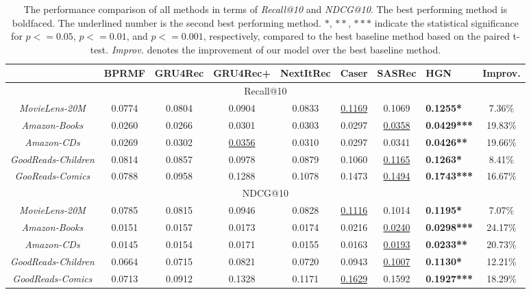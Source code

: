 \documentclass[sigconf]{acmart}
\begin{document}
\begin{table*}[ht]
\caption{\label{tab:performance_comparison}The performance comparison of all methods in terms of \textit{Recall@10} and \textit{NDCG@10}. The best performing method is boldfaced. The underlined number is the second best performing method. $ * $, $ ** $, $ *** $ indicate the statistical significance for $ p <= 0.05 $, $ p <= 0.01 $, and $ p <= 0.001 $, respectively, compared to the best baseline method based on the paired t-test. \textit{Improv.} denotes the improvement of our model over the best baseline method.}
\begin{tabular}{|c|c| c c c| c c| l| c|}
\hline
& \textbf{BPRMF} & \textbf{GRU4Rec} & \textbf{GRU4Rec+} & \textbf{NextItRec} & \textbf{Caser} & \textbf{SASRec} & \textbf{HGN} & \multicolumn{1}{l|}{\textbf{Improv.}} \\\hline
\multicolumn{9}{|c|}{Recall@10} \\
\hline
\textit{MovieLens-20M} & 0.0774 & 0.0804 & 0.0904 & 0.0833 & \underline{0.1169} & 0.1069 & \textbf{0.1255*} & 7.36\% \\
\textit{Amazon-Books} & 0.0260 & 0.0266 & 0.0301 & 0.0303 & 0.0297 & \underline{0.0358} & \textbf{0.0429***} & 19.83\% \\
\textit{Amazon-CDs} & 0.0269 & 0.0302 & \underline{0.0356} & 0.0310 & 0.0297 & 0.0341 & \textbf{0.0426**} & 19.66\% \\
\textit{GoodReads-Children} & 0.0814 & 0.0857 & 0.0978 & 0.0879 & 0.1060 & \underline{0.1165} & \textbf{0.1263*} & 8.41\% \\
\textit{GooReads-Comics} & 0.0788  & 0.0958 & 0.1288 & 0.1078 & 0.1473 & \underline{0.1494} & \textbf{0.1743***} & 16.67\% \\
\hline
\multicolumn{9}{|c|}{NDCG@10} \\ 
\hline
\textit{MovieLens-20M} & 0.0785 & 0.0815 & 0.0946 & 0.0828 & \underline{0.1116} & 0.1014 & \textbf{0.1195*} & 7.07\% \\
\textit{Amazon-Books} & 0.0151  & 0.0157 & 0.0173 & 0.0174 & 0.0216 & \underline{0.0240} & \textbf{0.0298***} & 24.17\% \\ 
\textit{Amazon-CDs} & 0.0145 & 0.0154 & 0.0171 & 0.0155 & 0.0163 & \underline{0.0193} & \textbf{0.0233**} & 20.73\% \\
\textit{GoodReads-Children} & 0.0664 & 0.0715 & 0.0821 & 0.0720 & 0.0943 & \underline{0.1007} & \textbf{0.1130*} & 12.21\% \\
\textit{GoodReads-Comics} & 0.0713 & 0.0912 & 0.1328 & 0.1171 & \underline{0.1629} & 0.1592 & \textbf{0.1927***} & 18.29\% \\
\hline
\end{tabular}
\vspace{-0.3cm}
\end{table*}
\end{document}

